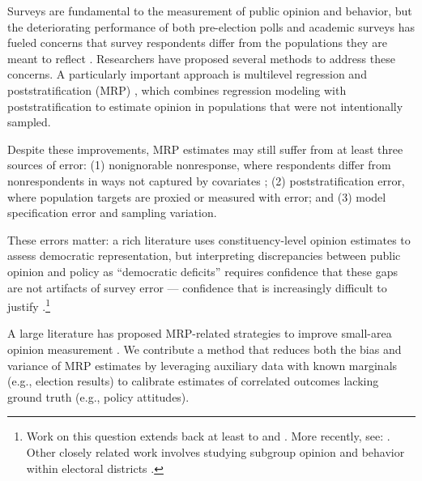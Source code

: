 


Surveys are fundamental to the measurement of public opinion and behavior, but the deteriorating performance of both pre-election polls \citep{Cetal:2021,Keta:2016} and academic surveys \citep{Jacobson2022} has fueled concerns that survey respondents differ from the populations they are meant to reflect \citep{PNAS2023,Bailey2023}.
Researchers have proposed several methods to address these concerns. 
A particularly important approach is multilevel regression and poststratification (MRP) \citep{GL:1997,PGB:2004}, which combines regression modeling with poststratification to estimate opinion in populations that were not intentionally sampled.

Despite these improvements, MRP estimates may still suffer from at least three sources of error: (1) nonignorable nonresponse, where respondents differ from nonrespondents in ways not captured by covariates \citep[e.g.,][]{CLT:2022}; (2) poststratification error, where population targets are proxied or measured with error; and (3) model specification error and sampling variation.

These errors matter: a rich literature uses constituency-level opinion estimates to assess democratic representation, but interpreting discrepancies between public opinion and policy as ``democratic deficits'' \citep{LP:2012} requires confidence that these gaps are not artifacts of survey error --- confidence that is increasingly difficult to justify \citep{C:2022}.\footnote{Work on this question extends back at least to \citet{MS:1963} and \citet{A:1978}.  More recently, see: \citet{Gelman2009,LP:2012,LPJ:2008,C:2006,TW:2013,T:2015,CW:2022,SP:2023,BS:2018,HFMS:2019}.
Other closely related work involves studying subgroup opinion and behavior within electoral districts \citep{GG:2013,Kuriwaki2023,LS:2019,WR:2012}.}

A large literature has proposed MRP-related strategies to improve small-area opinion measurement \citep{GG:2013,HanrettyLauderdaleVivyan2016,LW:2017,B:2019,CW:2019,Ornstein2020,BruchFelderer2022, BLW:2022,G:2023,BMFH:2023, RMO:2023}.
We contribute a method that reduces both the bias and variance of MRP estimates by leveraging auxiliary data with known marginals (e.g., election results) to calibrate estimates of correlated outcomes lacking ground truth (e.g., policy attitudes).

